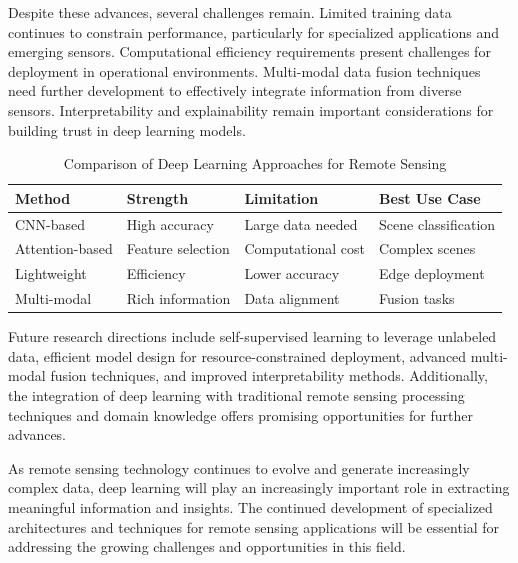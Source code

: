 \documentclass[12pt,a4paper]{article}
\begin{document}
Despite these advances, several challenges remain. Limited training data continues to constrain performance, particularly for specialized applications and emerging sensors. Computational efficiency requirements present challenges for deployment in operational environments. Multi-modal data fusion techniques need further development to effectively integrate information from diverse sensors. Interpretability and explainability remain important considerations for building trust in deep learning models.

\begin{table}[htbp]
\centering
\caption{Comparison of Deep Learning Approaches for Remote Sensing}
\label{tab:comparison}
\begin{tabular}{@{}llll@{}}
\toprule
\textbf{Method} & \textbf{Strength} & \textbf{Limitation} & \textbf{Best Use Case} \\ 
\midrule
CNN-based & High accuracy & Large data needed & Scene classification \\
Attention-based & Feature selection & Computational cost & Complex scenes \\
Lightweight & Efficiency & Lower accuracy & Edge deployment \\
Multi-modal & Rich information & Data alignment & Fusion tasks \\
\bottomrule
\end{tabular}
\end{table}

Future research directions include self-supervised learning to leverage unlabeled data, efficient model design for resource-constrained deployment, advanced multi-modal fusion techniques, and improved interpretability methods. Additionally, the integration of deep learning with traditional remote sensing processing techniques and domain knowledge offers promising opportunities for further advances.

As remote sensing technology continues to evolve and generate increasingly complex data, deep learning will play an increasingly important role in extracting meaningful information and insights. The continued development of specialized architectures and techniques for remote sensing applications will be essential for addressing the growing challenges and opportunities in this field.
\end{document}
